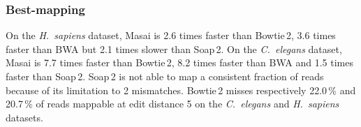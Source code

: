 
\subsubsection{Best-mapping}
On the \emph{H.~sapiens} dataset, Masai is 2.6 times faster than Bowtie\,2, 3.6 times faster than BWA but 2.1 times slower than Soap\,2.
On the \emph{C.~elegans} dataset, Masai is 7.7 times faster than Bowtie\,2, 8.2 times faster than BWA and 1.5 times faster than Soap\,2.
Soap\,2 is not able to map a consistent fraction of reads because of its limitation to 2 mismatches.
Bowtie\,2 misses respectively 22.0\,\% and 20.7\,\% of reads mappable at edit distance 5 on the \emph{C.~elegans} and \emph{H.~sapiens} datasets.

\begin{table*}[t]
  \caption[Masai performance on real data]{
    \label{tab:masai:runtime}
    Performance on real data using $10\,\text{M}\times 100\,\text{bp}$ Illumina reads.
	Rabema best column: in large are shown the percentage of reads mapped with the minimal number of errors (up to 5\%) and in small the percentage of reads that were mapped with $\bigl(\begin{smallmatrix}\mbox{\tiny 0}&\mbox{\tiny 1\%}&\mbox{\tiny 2\%}\\\mbox{\tiny 3\%}&\mbox{\tiny 4\%}&\mbox{\tiny 5\%}\end{smallmatrix}\bigr)$ errors.
	Remarks: SHRiMP\,2 is not able to map the \emph{H.~sapiens} dataset within 4 days; Hobbes systematically crashes in all but the \emph{D.~melanogaster} dataset.
  }
	\vspace{-3mm}
	\center
	\sffamily
	\footnotesize
	\resizebox{0.95\textwidth}{!}
	{
		\renewcommand{\tabcolsep}{0.8ex}
		
	}
\end{table*}



